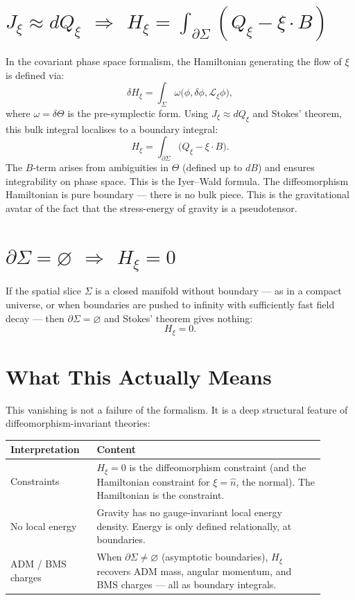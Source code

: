 \documentclass[12pt]{article}
\newcommand{\blueheading}[1]{\textcolor{sectionblue}{#1}}
\begin{document}
\section{\blueheading{$J_{\xi}\approx dQ_{\xi}$ $\Rightarrow$ $H_{\xi}=\int_{\partial\Sigma}(Q_{\xi}-\xi\cdot B)$}}

In the covariant phase space formalism, the Hamiltonian generating the flow of $\xi$ is defined via:
\[
\delta H_{\xi}=\int_{\Sigma}\omega\bigl(\phi,\delta\phi,\mathcal{L}_{\xi}\phi\bigr),
\]
where $\omega=\delta\Theta$ is the pre-symplectic form. Using $J_{\xi}\approx dQ_{\xi}$ and Stokes' theorem, this bulk integral localises to a boundary integral:
\[
H_{\xi}=\int_{\partial\Sigma}\bigl(Q_{\xi}-\xi\cdot B\bigr).
\]
The $B$-term arises from ambiguities in $\Theta$ (defined up to $dB$) and ensures integrability on phase space. This is the Iyer--Wald formula. The diffeomorphism Hamiltonian is pure boundary --- there is no bulk piece. This is the gravitational avatar of the fact that the stress-energy of gravity is a pseudotensor.

\section{\blueheading{$\partial\Sigma=\varnothing$ $\Rightarrow$ $H_{\xi}=0$}}

If the spatial slice $\Sigma$ is a closed manifold without boundary --- as in a compact universe, or when boundaries are pushed to infinity with sufficiently fast field decay --- then $\partial\Sigma=\varnothing$ and Stokes' theorem gives nothing:
\[
H_{\xi}=0.
\]

\section{\blueheading{What This Actually Means}}

This vanishing is not a failure of the formalism. It is a deep structural feature of diffeomorphism-invariant theories:

\begin{center}
\begin{tabular}{>{\raggedright\arraybackslash}p{0.24\linewidth} >{\raggedright\arraybackslash}p{0.66\linewidth}}
\toprule
\textbf{Interpretation} & \textbf{Content} \\
\midrule
Constraints & $H_{\xi}=0$ is the diffeomorphism constraint (and the Hamiltonian constraint for $\xi=\hat n$, the normal). The Hamiltonian is the constraint. \\
\addlinespace
No local energy & Gravity has no gauge-invariant local energy density. Energy is only defined relationally, at boundaries. \\
\addlinespace
ADM / BMS charges & When $\partial\Sigma\neq\varnothing$ (asymptotic boundaries), $H_{\xi}$ recovers ADM mass, angular momentum, and BMS charges --- all as boundary integrals. \\
\bottomrule
\end{tabular}
\end{center}
\end{document}
